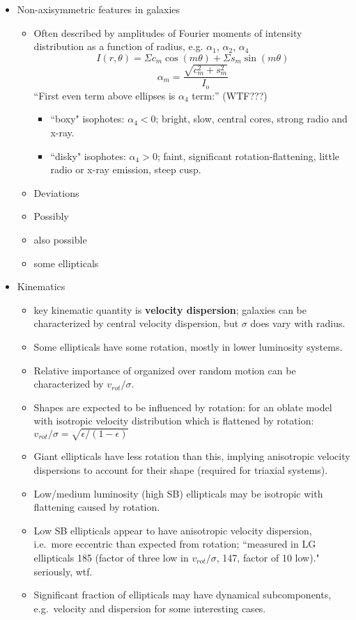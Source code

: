 \documentclass[12pt]{article}
\begin{document}
\begin{itemize}
    \item Non-axisymmetric features in galaxies
    \begin{itemize}
        \item Often described by amplitudes of Fourier moments of
          intensity distribution as a function of radius, e.g.
          $\alpha_1$, $\alpha_2$, $\alpha_4$
          $$ I(r,\theta)=\Sigma c_m\cos(m\theta)+\Sigma s_m\sin(m\theta) $$
          $$ \alpha_m = \frac{\sqrt{c^2_m + s_m^2}}{I_o} $$
          ``First even term above ellipses is $\alpha_4$ term:'' (WTF???)
          \begin{itemize}
             \item ``boxy" isophotes: $\alpha_4 < 0$;
                 bright, slow, central cores, strong radio and x-ray.
             \item ``disky" isophotes: $\alpha_4 > 0$;
                 faint, significant rotation-flattening, little
                 radio or x-ray emission, steep cusp.
          \end{itemize}
      \item Deviations
      \item Possibly
      \item also possible
      \item some ellipticals
    \end{itemize}

  \item Kinematics
  \begin{itemize}
      \item key kinematic quantity is \textbf{velocity dispersion};
          galaxies can be characterized by central velocity dispersion, but
          $\sigma$ does vary with radius.
      \item Some ellipticals have some rotation, mostly in lower
          luminosity systems.
       \item Relative importance of organized over random motion can be
        characterized by $v_{rot}/\sigma$.
        \item Shapes are expected to be influenced by rotation: for an
        oblate model with isotropic velocity distribution which is
        flattened by rotation: $v_{rot}/\sigma =
        \sqrt{\epsilon/(1-\epsilon)}$
        \item Giant ellipticals have less rotation than this, implying
        anisotropic velocity dispersions to account for their shape
        (required for triaxial systems).
        \item Low/medium luminosity (high SB) ellipticals may be isotropic
        with flattening caused by rotation.
        \item Low SB ellipticals appear to have anisotropic velocity
        dispersion, i.e.\ more eccentric than expected from rotation;
        ``measured in LG ellipticals 185 (factor of three low in
        $v_{rot}/\sigma$, 147, factor of 10 low)." seriously, wtf.
        \item Significant fraction of ellipticals may have dynamical
        subcomponents, e.g.\ velocity and dispersion for some interesting
        cases.
  \end{itemize}


\end{itemize}
\end{document}
